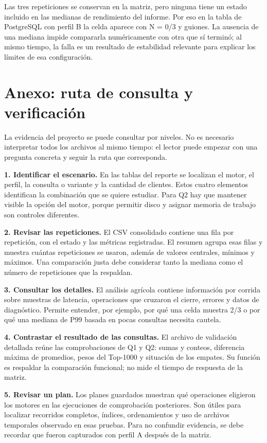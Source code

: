 \documentclass[12pt,letterpaper]{article}
\begin{document}
Las tres repeticiones se conservan en la matriz, pero ninguna tiene un estado incluido en las medianas de rendimiento del informe. Por eso en la tabla de PostgreSQL con perfil B la celda aparece con N = 0/3 y guiones. La ausencia de una mediana impide compararla numéricamente con otra que sí terminó; al mismo tiempo, la falla es un resultado de estabilidad relevante para explicar los límites de esa configuración.

\section*{Anexo: ruta de consulta y verificación}
La evidencia del proyecto se puede consultar por niveles. No es necesario interpretar todos los archivos al mismo tiempo: el lector puede empezar con una pregunta concreta y seguir la ruta que corresponda.

\textbf{1. Identificar el escenario.} En las tablas del reporte se localizan el motor, el perfil, la consulta o variante y la cantidad de clientes. Estos cuatro elementos identifican la combinación que se quiere estudiar. Para Q2 hay que mantener visible la opción del motor, porque permitir disco y asignar memoria de trabajo son controles diferentes.

\textbf{2. Revisar las repeticiones.} El CSV consolidado contiene una fila por repetición, con el estado y las métricas registradas. El resumen agrupa esas filas y muestra cuántas repeticiones se usaron, además de valores centrales, mínimos y máximos. Una comparación justa debe considerar tanto la mediana como el número de repeticiones que la respaldan.

\textbf{3. Consultar los detalles.} El análisis agrícola contiene información por corrida sobre muestras de latencia, operaciones que cruzaron el cierre, errores y datos de diagnóstico. Permite entender, por ejemplo, por qué una celda muestra 2/3 o por qué una mediana de P99 basada en pocas consultas necesita cautela.

\textbf{4. Contrastar el resultado de las consultas.} El archivo de validación detallada reúne las comprobaciones de Q1 y Q2: sumas y conteos, diferencia máxima de promedios, pesos del Top-1000 y situación de los empates. Su función es respaldar la comparación funcional; no mide el tiempo de respuesta de la matriz.

\textbf{5. Revisar un plan.} Los planes guardados muestran qué operaciones eligieron los motores en las ejecuciones de comprobación posteriores. Son útiles para localizar recorridos completos, índices, ordenamientos y uso de archivos temporales observado en esas pruebas. Para no confundir evidencia, se debe recordar que fueron capturados con perfil A después de la matriz.
\end{document}

